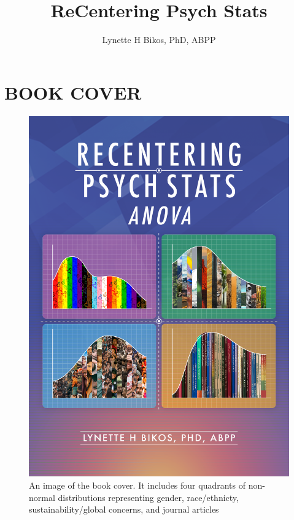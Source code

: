 \documentclass[
  english,
]{book}
\title{ReCentering Psych Stats}
\author{Lynette H Bikos, PhD, ABPP}
\date{}
\begin{document}
\maketitle

{
\setcounter{tocdepth}{1}
\tableofcontents
}
\hypertarget{book-cover}{%
\chapter*{BOOK COVER}\label{book-cover}}

\begin{figure}
\centering
\includegraphics{images/ReC_ANOVA_bookcover.png}
\caption{An image of the book cover. It includes four quadrants of non-normal distributions representing gender, race/ethnicty, sustainability/global concerns, and journal articles}
\end{figure}
\end{document}
